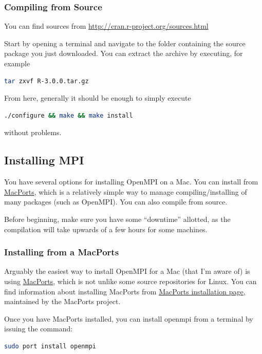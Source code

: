 \subsubsection{Compiling from Source}

You can find  sources from \url{http://cran.r-project.org/sources.html}

Start by opening a terminal and navigate to the folder containing the  source package you just downloaded.  You can extract the archive by executing, for example
\begin{lstlisting}[language=sh]
tar zxvf R-3.0.0.tar.gz
\end{lstlisting}

From here, generally it should be enough to simply execute
\begin{lstlisting}[language=sh]
./configure && make && make install
\end{lstlisting}
without problems.









\subsection{Installing MPI}

You have several options for installing OpenMPI on a Mac.  You can install from \href{https://www.macports.org/}{MacPorts}, which is a relatively simple way to manage compiling/installing of many packages (such as OpenMPI).  You can also compile from source.

Before beginning, make sure you have some ``downtime'' allotted, as the compilation will take upwards of a few hours for some machines.

\subsubsection{Installing from a MacPorts}

Arguably the easiest way to install OpenMPI for a Mac (that I'm aware of) is using \href{https://www.macports.org/}{MacPorts}, which is not unlike some source repositories for Linux.  You can find information about installing MacPorts from \href{https://www.macports.org/install.php}{MacPorts installation page}, maintained by the MacPorts project.

Once you have MacPorts installed, you can install openmpi from a terminal by issuing the command:
\begin{lstlisting}[language=sh]
sudo port install openmpi
\end{lstlisting}






